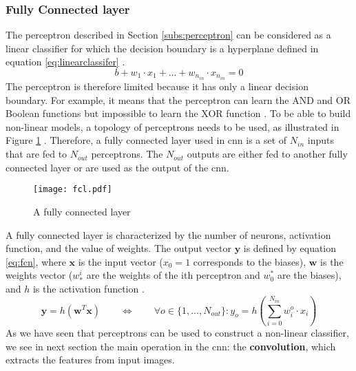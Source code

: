 \subsubsection{Fully Connected layer} \label{subs:fcl}
The perceptron described in Section \ref{subs:perceptron} can be considered as a linear classifier for which the decision boundary is a hyperplane defined in equation \eqref{eq:linearclassifer} \cite{matteucci_artificial_2019}.
%
\begin{equation}
    b + w_1 \cdot x_1 + ... + w_{n_{in}} \cdot x_{n_{in}} = 0
    \label{eq:linearclassifer}
\end{equation}
%
The perceptron is therefore limited because it has only a linear decision boundary. For example, it means that the perceptron can learn the AND and OR Boolean functions but impossible to learn the XOR function \cite{minsky_perceptrons_1969}. To be able to build non-linear models, a topology of perceptrons needs to be used, as illustrated in Figure \ref{fig:fcn} \cite{khan_survey_2020}. Therefore, a fully connected layer used in \acrshort{cnn} is a set of $N_{in}$ inputs that are fed to $N_{out}$ perceptrons. The $N_{out}$ outputs are either fed to another fully connected layer or are used as the output of the \acrshort{cnn}.
%
\begin{figure}[H]
    \centering
    \texttt{[image: fcl.pdf]}
    \caption{A fully connected layer}
    \label{fig:fcn}
\end{figure}
%
A fully connected layer is characterized by the number of neurons, activation function, and the value of weights. The output vector $\boldsymbol{y}$ is defined by equation \eqref{eq:fcn}, where $\boldsymbol{x}$ is the input vector ($x_0 = 1$ corresponds to the biases), $\boldsymbol{w}$ is the weights vector ($w^i_*$ are the weights of the ith perceptron and $w^*_0$ are the biases), and $h$ is the activation function \cite{abdelouahab_accelerating_2018}.
%
\begin{equation}
    \boldsymbol{y} = h(\boldsymbol{w}^T \boldsymbol{x}) \qquad \Leftrightarrow \qquad \forall o \in \{ 1, ..., N_{out} \} : y_o = h(\sum^{N_{in}}_{i=0} w^o_i \cdot x_i)
    \label{eq:fcn}
\end{equation}
%
As we have seen that perceptrons can be used to construct a non-linear classifier, we see in next section the main operation in the \acrshort{cnn}: the \textbf{convolution}, which extracts the features from input images.